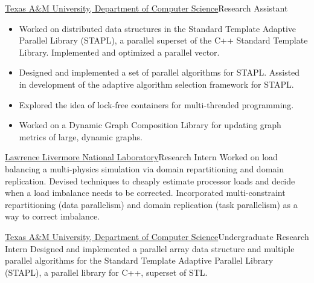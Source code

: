 		{\href{http://www.cse.tamu.edu/}{Texas A\&M University, Department of Computer Science}}{Research Assistant}{}{}
		{\begin{itemize}
			\item Worked on distributed data structures in the Standard Template Adaptive Parallel Library (STAPL),
				a parallel superset of the C++ Standard Template Library. Implemented and optimized a parallel vector.
			\item Designed and implemented a set of parallel algorithms for STAPL.
				Assisted in development of the adaptive algorithm selection framework for STAPL.
			\item Explored the idea of lock-free containers for multi-threaded programming.
			\item Worked on a Dynamic Graph Composition Library for updating graph metrics of large, dynamic graphs.
		\end{itemize}}

		{\href{http://www.llnl.gov}{Lawrence Livermore National Laboratory}}{Research Intern}{}{}
		{Worked on load balancing a multi-physics simulation via domain repartitioning
		and domain replication.  Devised techniques to cheaply estimate processor loads and decide
		when a load imbalance needs to be corrected.  Incorporated multi-constraint
		repartitioning (data parallelism) and domain replication (task parallelism)
		as a way to correct imbalance.
		}

		{\href{http://www.cse.tamu.edu/}{Texas A\&M University, Department of Computer Science}}{Undergraduate Research Intern}{}{}
		{Designed and implemented a parallel array data structure and multiple
		parallel algorithms for the Standard Template Adaptive Parallel Library
		(STAPL), a parallel library for C++, superset of STL.}
